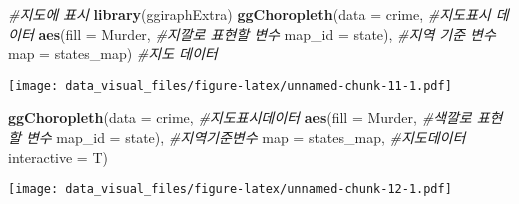 \documentclass[]{article}
\newenvironment{Shaded}{\begin{snugshade}}{\end{snugshade}}
\newcommand{\CommentTok}[1]{\textcolor[rgb]{0.56,0.35,0.01}{\textit{#1}}}
\newcommand{\DataTypeTok}[1]{\textcolor[rgb]{0.13,0.29,0.53}{#1}}
\newcommand{\KeywordTok}[1]{\textcolor[rgb]{0.13,0.29,0.53}{\textbf{#1}}}
\newcommand{\NormalTok}[1]{#1}
\begin{document}
\begin{Shaded}
\begin{Highlighting}[]
\CommentTok{#지도에 표시}
\KeywordTok{library}\NormalTok{(ggiraphExtra)}
\KeywordTok{ggChoropleth}\NormalTok{(}\DataTypeTok{data =}\NormalTok{ crime, }\CommentTok{#지도표시 데이터 }
             \KeywordTok{aes}\NormalTok{(}\DataTypeTok{fill =}\NormalTok{ Murder, }\CommentTok{#지깔로 표현할 변수 }
                 \DataTypeTok{map_id =}\NormalTok{ state), }\CommentTok{#지역 기준 변수}
             \DataTypeTok{map =}\NormalTok{ states_map) }\CommentTok{#지도 데이터 }
\end{Highlighting}
\end{Shaded}

\texttt{[image: data\_visual\_files/figure-latex/unnamed-chunk-11-1.pdf]}

\begin{Shaded}
\begin{Highlighting}[]
\KeywordTok{ggChoropleth}\NormalTok{(}\DataTypeTok{data =}\NormalTok{ crime, }\CommentTok{#지도표시데이터}
             \KeywordTok{aes}\NormalTok{(}\DataTypeTok{fill =}\NormalTok{ Murder, }\CommentTok{#색깔로 표현할 변수 }
                 \DataTypeTok{map_id =}\NormalTok{ state), }\CommentTok{#지역기준변수 }
             \DataTypeTok{map =}\NormalTok{ states_map, }\CommentTok{#지도데이터 }
             \DataTypeTok{interactive =}\NormalTok{ T)}
\end{Highlighting}
\end{Shaded}

\texttt{[image: data\_visual\_files/figure-latex/unnamed-chunk-12-1.pdf]}
\end{document}

